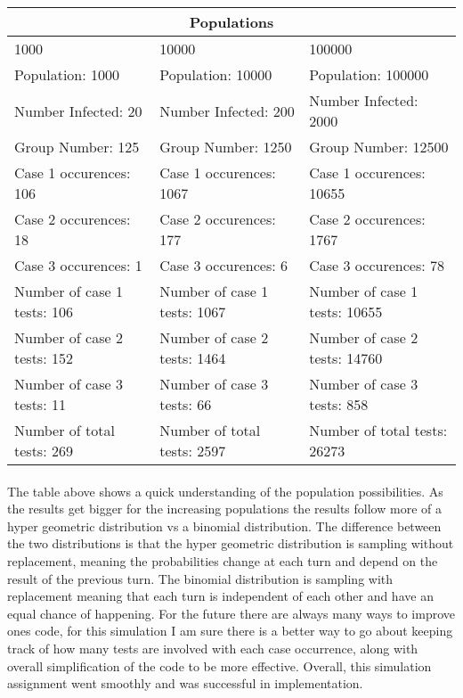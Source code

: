 \documentclass[letterpaper, 10pt,DIV=13]{scrartcl}
\numberwithin{equation}{section} %
\numberwithin{figure}{section} %
\numberwithin{table}{section} %
\begin{document}
\begin{center}
\begin{tabular}{ |p{4.5cm}||p{4.5cm}||p{4.5cm}|  }
 \hline
 \multicolumn{3}{|c|}{Populations} \\
 \hline
 1000 & 10000 & 100000\\
 \hline
 Population: 1000  & Population: 10000 &  Population: 100000\\
 Number Infected: 20 & Number Infected: 200 & Number Infected: 2000\\
 Group Number: 125 & Group Number: 1250 & Group Number: 12500\\
 Case 1 occurences: 106 & Case 1 occurences: 1067 & Case 1 occurences: 10655\\
 Case 2 occurences: 18 & Case 2 occurences: 177 & Case 2 occurences: 1767 \\
 Case 3 occurences: 1 & Case 3 occurences: 6 & Case 3 occurences: 78 \\
 Number of case 1 tests: 106 & Number of case 1 tests: 1067 & Number of case 1 tests: 10655 \\
 Number of case 2 tests: 152 & Number of case 2 tests: 1464 & Number of case 2 tests: 14760 \\
 Number of case 3 tests: 11 & Number of case 3 tests: 66 & Number of case 3 tests: 858 \\
 Number of total tests: 269 & Number of total tests: 2597 & Number of total tests: 26273 \\
 
 \hline
\end{tabular}
\end{center}

\paragraph{} The table above shows a quick understanding of the population possibilities. As the results get bigger for the increasing populations the results follow more of a hyper geometric distribution vs a binomial distribution. The difference between the two distributions is that the hyper geometric distribution is sampling without replacement, meaning the probabilities change at each turn and depend on the result of the previous turn. The binomial distribution is sampling with replacement meaning that each turn is independent of each other and have an equal chance of happening. For the future there are always many ways to improve ones code, for this simulation I am sure there is a better way to go about keeping track of how many tests are involved with each case occurrence, along with overall simplification of the code to be more effective. Overall, this simulation assignment went smoothly and was successful in implementation.
\end{document}
